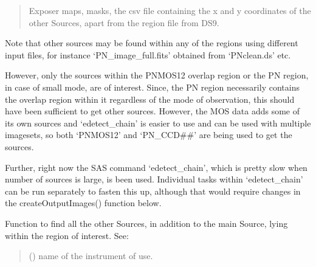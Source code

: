 \documentclass[letterpaper,10pt,english]{sphinxmanual}
\begin{document}
\begin{fulllineitems}
\begin{fulllineitems}
\begin{quote}
\begin{description}
\sphinxAtStartPar
Exposer maps, masks, the csv file containing the x and y coordinates of the other Sources,
apart from the region file from DS9.

\end{description}\end{quote}

\sphinxAtStartPar
Note that other sources may be found within any of the regions using different input files,
for instance ‘PN\_image\_full.fits’ obtained from ‘PNclean.ds’ etc.

\sphinxAtStartPar
However, only the sources within the PNMOS12 overlap region or the PN region, in case of small mode,
are of interest. Since, the PN region necessarily contains the overlap region within it regardless of
the mode of observation, this should have been sufficient to get other sources. However, the MOS data adds
some of its own sources and ‘edetect\_chain’ is easier to use and can be used with multiple imagesets,
so both ‘PNMOS12’ and ‘PN\_CCD\#\#’ are being used to get the sources.

\sphinxAtStartPar
Further, right now the SAS command ‘edetect\_chain’, which is pretty slow when number of sources is large,
is been used. Individual tasks within ‘edetect\_chain’ can be run separately to fasten this up, although
that would require changes in the createOutputImages() function below.

\end{fulllineitems}


\begin{fulllineitems}
\label{\detokenize{xmmPipeline:xmmPipeline.epicObj.epicObj.find_otherSources_indi}}
\pysigstartsignatures
{}
\pysigstopsignatures
\sphinxAtStartPar
Function to find all the other Sources, in addition to the main Source, lying within the region of interest.
See: 
\begin{quote}\begin{description}
\sphinxAtStartPar
{} () \textendash{} name of the instrument of use.


\end{description}
\end{quote}
\end{fulllineitems}
\end{fulllineitems}
\end{document}
